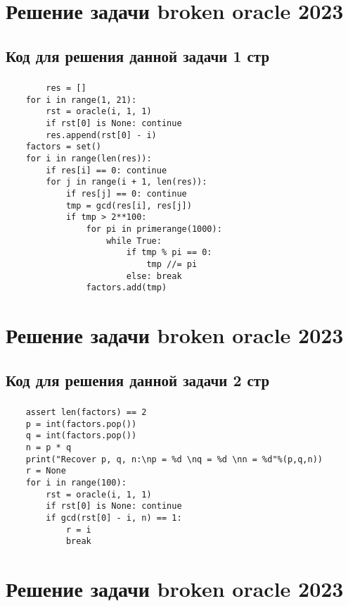 \documentclass[t]{beamer}
\begin{document}
\section{Решение задачи broken oracle 2023}
\subsection{Код для решения данной задачи 1 стр}
\begin{frame}[fragile]
\frametitle{\insertsection} 
\framesubtitle{\insertsubsection}
\footnotesize
\smaller
\begin{lstlisting}
        res = []                               
    for i in range(1, 21):
        rst = oracle(i, 1, 1)
        if rst[0] is None: continue
        res.append(rst[0] - i)
    factors = set()
    for i in range(len(res)):                
        if res[i] == 0: continue
        for j in range(i + 1, len(res)):
            if res[j] == 0: continue
            tmp = gcd(res[i], res[j])
            if tmp > 2**100:
                for pi in primerange(1000):
                    while True:
                        if tmp % pi == 0:
                            tmp //= pi
                        else: break
                factors.add(tmp)
\end{lstlisting}	
\end{frame}

\section{Решение задачи broken oracle 2023}
\subsection{Код для решения данной задачи 2 стр}
\begin{frame}[fragile]
\frametitle{\insertsection} 
\framesubtitle{\insertsubsection}
\footnotesize
\smaller
\begin{lstlisting}
    assert len(factors) == 2
    p = int(factors.pop())
    q = int(factors.pop())
    n = p * q
    print("Recover p, q, n:\np = %d \nq = %d \nn = %d"%(p,q,n))
    r = None
    for i in range(100):
        rst = oracle(i, 1, 1)
        if rst[0] is None: continue
        if gcd(rst[0] - i, n) == 1:
            r = i
            break 
\end{lstlisting}	
\end{frame}

\section{Решение задачи broken oracle 2023}
\end{document}
